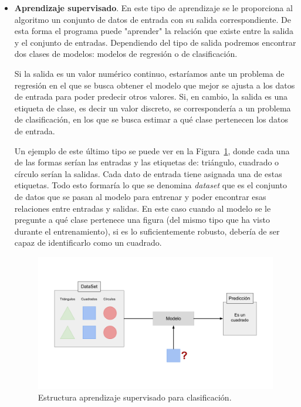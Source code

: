 \documentclass[a4paper, 12pt]{book}
\begin{document}
\begin{itemize}
    \item \textbf{Aprendizaje supervisado}. En este tipo de aprendizaje se le proporciona al algoritmo un conjunto de datos de entrada con su salida correspondiente. De esta forma el programa puede "aprender" la relación que existe entre la salida y el conjunto de entradas. Dependiendo del tipo de salida podremos encontrar dos clases de modelos: modelos de regresión o de clasificación.
    
    Si la salida es un valor numérico continuo, estaríamos ante un problema de regresión en el que se busca obtener el modelo que mejor se ajusta a los datos de entrada para poder predecir otros valores. Si, en cambio, la salida es una etiqueta de clase, es decir un valor discreto, se correspondería a un problema de clasificación, en los que se busca estimar a qué clase pertenecen los datos de entrada. 
    
    Un ejemplo de este último tipo se puede ver en la Figura~\ref{fig:a_supervisado}, donde cada una de las formas serían las entradas y las etiquetas de: triángulo, cuadrado o círculo serían la salidas. Cada dato de entrada tiene asignada una de estas etiquetas. Todo esto formaría lo que se denomina \textit{dataset} que es el conjunto de datos que se pasan al modelo para entrenar y poder encontrar esas relaciones entre entradas y salidas. En este caso cuando al modelo se le pregunte a qué clase pertenece una figura (del mismo tipo que ha visto durante el entrenamiento), si es lo suficientemente robusto, debería de ser capaz de identificarlo como un cuadrado.
    
    \begin{figure}[htb]
      \centering
      \includegraphics[width=12cm, keepaspectratio]{img/a_supervisado.png}
      \caption{Estructura aprendizaje supervisado para clasificación.}\label{fig:a_supervisado}
    \end{figure}
    

\end{itemize}
\end{document}
